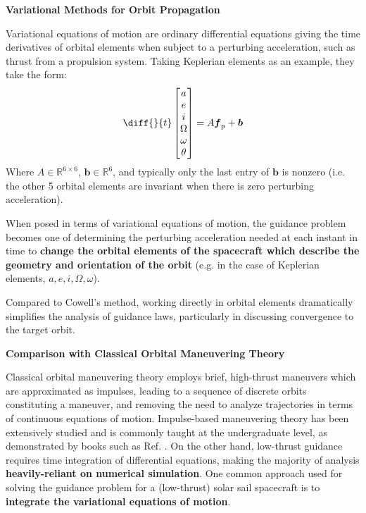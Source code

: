 \textbf{Variational Methods for Orbit Propagation}

Variational equations of motion are ordinary differential equations giving the time derivatives of orbital elements when subject to a perturbing acceleration, such as thrust from a propulsion system. Taking Keplerian elements as an example, they take the form:
\begin{equation*}
  \diff{}{t}
  \begin{bmatrix}
    a \\e\\i\\ \Omega \\ \omega \\ \theta
  \end{bmatrix}
  = A \boldsymbol{f}_\mathrm{p} + \boldsymbol{b}
\end{equation*}
Where \(A \in \mathbb{R}^{6\times6}\), \(\boldsymbol{b} \in  \mathbb{R}^{6}\), and typically only the last entry of \(\boldsymbol{b}\) is nonzero (i.e. the other 5 orbital elements are invariant when there is zero perturbing acceleration).

When posed in terms of variational equations of motion, the guidance problem becomes one of determining the perturbing acceleration needed at each instant in time to \textbf{change the orbital elements of the spacecraft which describe the geometry and orientation of the orbit} (e.g. in the case of Keplerian elements, \(a, e, i , \Omega, \omega\)).

Compared to Cowell's method, working directly in orbital elements dramatically simplifies the analysis of guidance laws, particularly in discussing convergence to the target orbit.

\textbf{Comparison with Classical Orbital Maneuvering Theory}

Classical orbital maneuvering theory employs brief, high-thrust maneuvers which are approximated as impulses, leading to a sequence of discrete orbits constituting a maneuver, and removing the need to analyze trajectories in terms of continuous equations of motion. Impulse-based maneuvering theory has been extensively studied and is commonly taught at the undergraduate level, as demonstrated by books such as Ref. \cite{book:1487513}. On the other hand, low-thrust guidance requires time integration of differential equations, making the majority of analysis \textbf{heavily-reliant on numerical simulation}. One common approach used for solving the guidance problem for a (low-thrust) solar sail spacecraft is to \textbf{integrate the variational equations of motion}.

